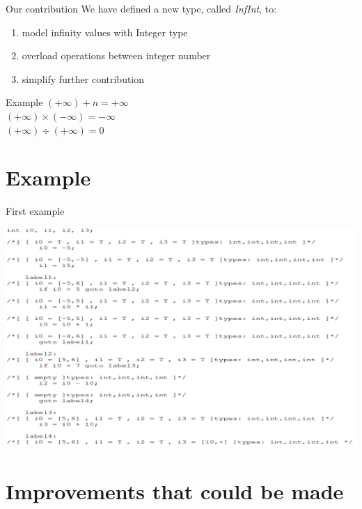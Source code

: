 \documentclass{beamer}
\begin{document}
	\begin{frame}{Our contribution}
		We have defined a new type, called \large\textit{InfInt}\normalsize, to:\\
		\begin{enumerate}
			\item model infinity values with Integer type
			\item overload operations between integer number
			\item simplify further contribution
		\end{enumerate}

	\begin{block}{Example}
		$(+\infty) + n = +\infty$\\
		$(+\infty) \times (-\infty) = -\infty$  \\
		$(+\infty) \div (+\infty) = 0$
	\end{block}
	\end{frame}

	\section{Example}
	
		\begin{frame}{First example}
		
		\begin{flalign}
			\includegraphics[scale=0.25]{images/firstcode.png}
		\end{flalign}
	
		\end{frame}

	\section{Improvements that could be made}
	\begin{frame}

	\end{frame}
\end{document}
